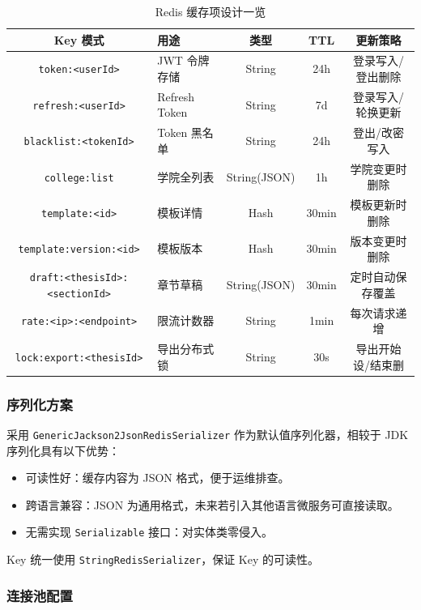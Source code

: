 \documentclass{../../softeng}
\begin{document}
\begin{table}[htbp]
\centering
\caption{Redis 缓存项设计一览}
\label{tab:redis-design}
\begin{tabular}{|c|p{3cm}|c|c|c|}
\hline
\textbf{Key 模式} & \textbf{用途} & \textbf{类型} & \textbf{TTL} & \textbf{更新策略} \\
\hline
\texttt{token:<userId>} & JWT 令牌存储 & String & 24h & 登录写入/登出删除 \\
\hline
\texttt{refresh:<userId>} & Refresh Token & String & 7d & 登录写入/轮换更新 \\
\hline
\texttt{blacklist:<tokenId>} & Token 黑名单 & String & 24h & 登出/改密写入 \\
\hline
\texttt{college:list} & 学院全列表 & String(JSON) & 1h & 学院变更时删除 \\
\hline
\texttt{template:<id>} & 模板详情 & Hash & 30min & 模板更新时删除 \\
\hline
\texttt{template:version:<id>} & 模板版本 & Hash & 30min & 版本变更时删除 \\
\hline
\texttt{draft:<thesisId>:<sectionId>} & 章节草稿 & String(JSON) & 30min & 定时自动保存覆盖 \\
\hline
\texttt{rate:<ip>:<endpoint>} & 限流计数器 & String & 1min & 每次请求递增 \\
\hline
\texttt{lock:export:<thesisId>} & 导出分布式锁 & String & 30s & 导出开始设/结束删 \\
\hline
\end{tabular}
\end{table}

\subsubsection{序列化方案}

采用 \texttt{GenericJackson2JsonRedisSerializer} 作为默认值序列化器，相较于 JDK 序列化具有以下优势：
\begin{itemize}
    \item 可读性好：缓存内容为 JSON 格式，便于运维排查。
    \item 跨语言兼容：JSON 为通用格式，未来若引入其他语言微服务可直接读取。
    \item 无需实现 \texttt{Serializable} 接口：对实体类零侵入。
\end{itemize}

Key 统一使用 \texttt{StringRedisSerializer}，保证 Key 的可读性。

\subsubsection{连接池配置}
\end{document}
